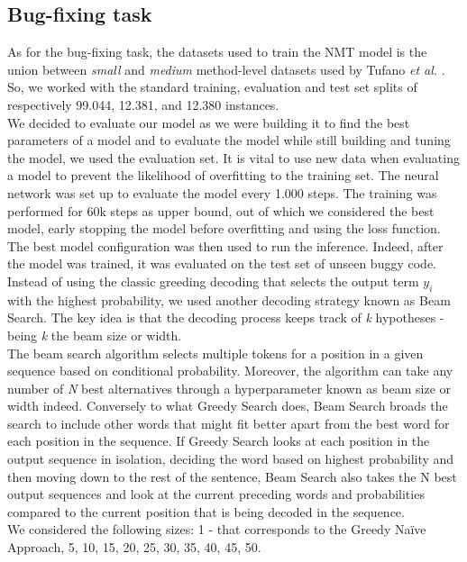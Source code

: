 \subsection{Bug-fixing task}
As for the bug-fixing task, the datasets used to train the NMT model is the union between \textit{small} and \textit{medium} method-level datasets
used by Tufano \textit{et al.} \cite{Tufano2019}. So, we worked with the standard training, evaluation and test set splits of respectively
99.044, 12.381, and 12.380 instances.\\
We decided to evaluate our model as we were building it to find the best parameters of 
a model and to evaluate the model while still building and tuning the model, we used the evaluation set. 
It is vital to use new data when evaluating a model to prevent the likelihood of overfitting to the 
training set. The neural network
was set up to evaluate the model every 1.000 steps. The training was performed for 60k steps as upper bound, 
out of which we considered the best model, early stopping the model before overfitting and using the loss function.
The best model configuration was then used to run the inference.
Indeed, after the model was trained, it was evaluated on the test set of unseen buggy code. 
Instead of using the classic greeding decoding that selects the output term \(y_i\) with the highest probability, we used another decoding
strategy known as Beam Search. 
The key idea is that the decoding process keeps track of \textit{k}
hypotheses - being \textit{k} the beam size or width.\\
The beam search algorithm selects multiple tokens for a position in a given sequence based on conditional probability. Moreover, the algorithm
can take any number of \textit{N} best alternatives through a hyperparameter known as beam size or width indeed. Conversely to what Greedy Search does, 
Beam Search broads the search to include other words that might fit better apart from the best word for each position in the sequence.
If Greedy Search looks at each position in the output sequence in isolation, deciding the word based on highest probability and then moving down to the rest of the sentence,
Beam Search also takes the N best output sequences and look at the current preceding words and probabilities compared to the current position that is being decoded in the sequence.\\
We considered the following sizes: 1 - that corresponds to the Greedy Naïve Approach, 5, 10, 15, 20, 25, 30, 35, 40, 45, 50.

